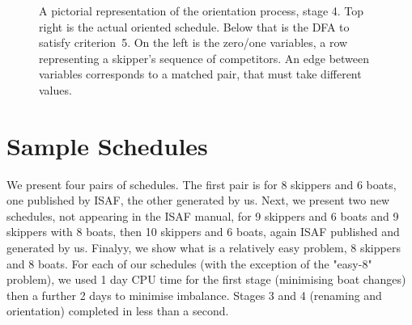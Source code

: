 \documentclass{llncs}
\begin{document}
\begin{figure}[tb]
    \caption{A pictorial representation of the orientation process, stage 4. Top right is the actual
        oriented schedule. Below that is the DFA to satisfy criterion~5. On the left is the zero/one
        variables, a row representing a skipper's sequence of competitors. An edge between variables
        corresponds to a matched pair, that must take different values.}\label{oriented}
\end{figure}

\section{Sample Schedules}\label{sec:samples}

We present four pairs of schedules. The first pair is for 8 skippers and 6 boats, one published by
ISAF, the other generated by us. Next, we present two new schedules, not appearing in the ISAF
manual, for 9 skippers and 6 boats and 9 skippers with 8 boats, then 10 skippers and
6 boats, again ISAF published and generated by us. Finalyy, we show what is a relatively easy problem, 8 skippers and 8 boats. 
For each of our schedules (with the exception of the "easy-8" problem), we used 1 day CPU time for the first stage (minimising boat changes) then a further 2 days to minimise imbalance. Stages 3 and 4 (renaming and orientation) completed in less than a second.
\end{document}

